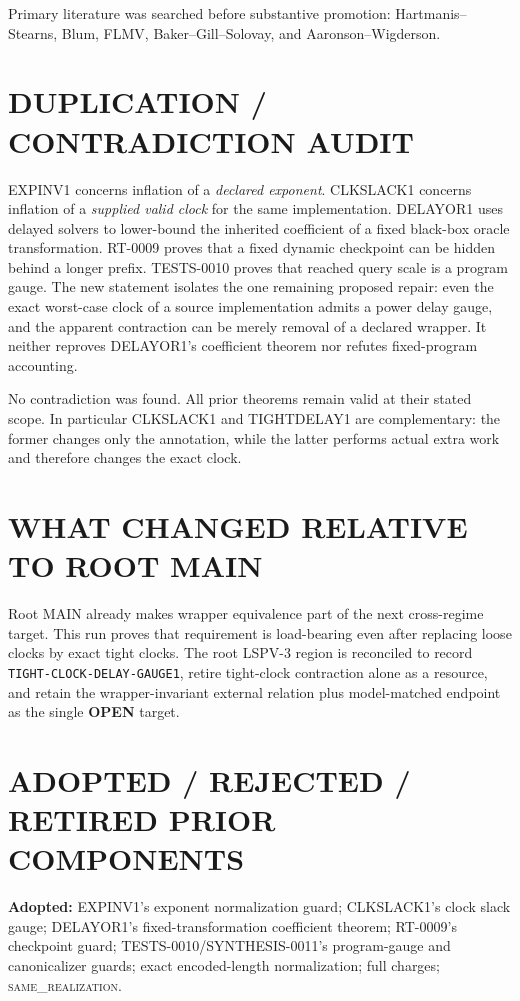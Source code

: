 \documentclass[11pt]{article}
\newcommand{\OPEN}{\textbf{OPEN}}
\newcommand{\same}{\textsc{same\_realization}}
\begin{document}
Primary literature was searched before substantive promotion: Hartmanis--
Stearns, Blum, FLMV, Baker--Gill--Solovay, and Aaronson--Wigderson.

\section{DUPLICATION / CONTRADICTION AUDIT}

EXPINV1 concerns inflation of a \emph{declared exponent}.  CLKSLACK1 concerns
inflation of a \emph{supplied valid clock} for the same implementation.
DELAYOR1 uses delayed solvers to lower-bound the inherited coefficient of a
fixed black-box oracle transformation.  RT-0009 proves that a fixed dynamic
checkpoint can be hidden behind a longer prefix.  TESTS-0010 proves that
reached query scale is a program gauge.  The new statement isolates the one
remaining proposed repair: even the exact worst-case clock of a source
implementation admits a power delay gauge, and the apparent contraction can
be merely removal of a declared wrapper.  It neither reproves DELAYOR1's
coefficient theorem nor refutes fixed-program accounting.

No contradiction was found.  All prior theorems remain valid at their stated
scope.  In particular CLKSLACK1 and TIGHTDELAY1 are complementary: the former
changes only the annotation, while the latter performs actual extra work and
therefore changes the exact clock.

\section{WHAT CHANGED RELATIVE TO ROOT MAIN}

Root MAIN already makes wrapper equivalence part of the next cross-regime
target.  This run proves that requirement is load-bearing even after replacing
loose clocks by exact tight clocks.  The root LSPV-3 region is reconciled to
record \texttt{TIGHT-CLOCK-DELAY-GAUGE1}, retire tight-clock contraction alone
as a resource, and retain the wrapper-invariant external relation plus
model-matched endpoint as the single \OPEN{} target.

\section{ADOPTED / REJECTED / RETIRED PRIOR COMPONENTS}

\textbf{Adopted:} EXPINV1's exponent normalization guard; CLKSLACK1's clock
slack gauge; DELAYOR1's fixed-transformation coefficient theorem; RT-0009's
checkpoint guard; TESTS-0010/SYNTHESIS-0011's program-gauge and canonicalizer
guards; exact encoded-length normalization; full charges; \same{}.
\end{document}
